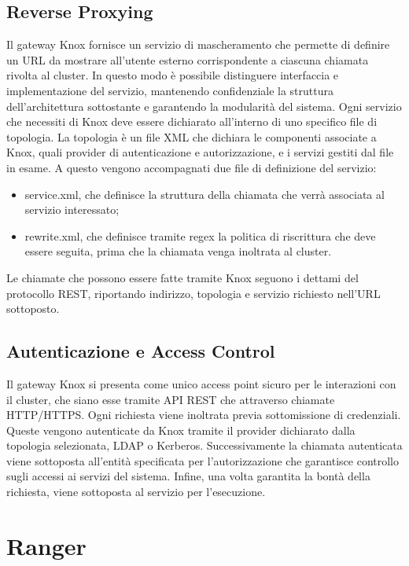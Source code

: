 \subsection{Reverse Proxying}
Il gateway Knox fornisce un servizio di mascheramento che permette di definire un URL da mostrare all'utente esterno corrispondente a ciascuna chiamata rivolta al cluster. In questo modo è possibile distinguere interfaccia e implementazione del servizio, mantenendo confidenziale la struttura dell'architettura sottostante e garantendo la modularità del sistema.
\newline
Ogni servizio che necessiti di Knox deve essere dichiarato all'interno di uno specifico file di topologia. La topologia è un file XML che dichiara le componenti associate a Knox, quali provider di autenticazione e autorizzazione, e i servizi gestiti dal file in esame.
A questo vengono accompagnati due file di definizione del servizio:
\begin{itemize}
	\item service.xml, che definisce la struttura della chiamata che verrà associata al servizio interessato;
	\item rewrite.xml, che definisce tramite regex la politica di riscrittura che deve essere seguita, prima che la chiamata venga inoltrata al cluster.
\end{itemize}
Le chiamate che possono essere fatte tramite Knox seguono i dettami del protocollo REST, riportando indirizzo, topologia e servizio richiesto nell'URL sottoposto.
\pagebreak

\subsection{Autenticazione e Access Control}
Il gateway Knox si presenta come unico access point sicuro per le interazioni con il cluster, che siano esse tramite API REST che attraverso chiamate HTTP/HTTPS. Ogni richiesta viene inoltrata previa sottomissione di credenziali. Queste vengono autenticate da Knox tramite il provider dichiarato dalla topologia selezionata, LDAP o Kerberos.
Successivamente la chiamata autenticata viene sottoposta all'entità specificata per l'autorizzazione che garantisce controllo sugli accessi ai servizi del sistema.
Infine, una volta garantita la bontà della richiesta, viene sottoposta al servizio per l'esecuzione.
\pagebreak

\section{Ranger}


